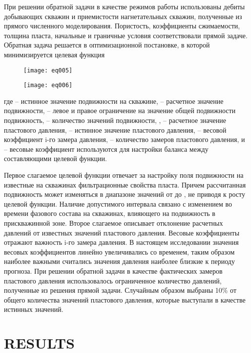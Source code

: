 \documentclass{article}
\begin{document}
При решении обратной задачи в качестве режимов работы использованы дебиты добывающих скважин и приемистости нагнетательных скважин, полученные из прямого численного моделирования. Пористость, коэффициенты сжимаемости, толщина пласта, начальные и граничные условия соответствовали прямой задаче. Обратная задача решается в оптимизационной постановке, в которой минимизируется целевая функция

\begin{figure}
	\centering
	\texttt{[image: eq005]}
	\caption{}
	\label{fig:eq005}
\end{figure}

\begin{figure}
	\centering
	\texttt{[image: eq006]}
	\caption{}
	\label{fig:eq006}
\end{figure}

где  – истинное значение подвижности на скважине,  – расчетное значение подвижности,  – левое и правое ограничение на значение общей подвижности подвижность,  – количество значений подвижности, ,  – расчетное значение пластового давления,  – истинное значение пластового давления,  – весовой коэффициент i-го замера давления,  – количество замеров пластового давления,  и   – весовые коэффициент используются для настройки баланса между составляющими целевой функции.

Первое слагаемое целевой функции отвечает за настройку поля подвижности на известные на скважинах фильтрационные свойства пласта. Причем рассчитанная подвижность может изменяться в диапазоне значений от  до , не приводя к росту целевой функции. Наличие допустимого интервала связано с изменением во времени фазового состава на скважинах, влияющего на подвижность в прискважинной зоне. Второе слагаемое описывает отклонение расчетных давлений от известных значений пластового давления. Весовые коэффициенты  отражают важность i-го замера давления. В настоящем исследовании значения весовых коэффициентов линейно увеличивались со временем, таким образом наиболее важными считались значения давления наиболее близкие к периоду прогноза. При решении обратной задачи в качестве фактических замеров пластового давления использовалось ограниченное количество давлений, полученные из решения прямой задачи. Случайным образом выбраны 10\% от общего количества значений пластового давления, которые выступали в качестве истинных значений.


\section{RESULTS}
\end{document}
